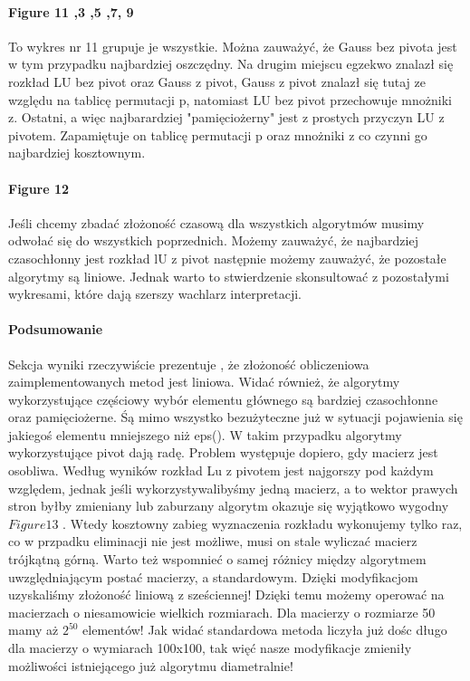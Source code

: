 \documentclass[11pt]{article}
\begin{document}
\begin{flushleft}
\begin{flushleft}
\paragraph{Figure 11 ,3 ,5 ,7, 9}
 To wykres nr 11 grupuje je wszystkie. Można zauważyć, że Gauss bez pivota jest w tym przypadku najbardziej oszczędny. Na drugim miejscu egzekwo znalazł się rozkład LU bez pivot oraz Gauss z pivot, Gauss z pivot znalazł się tutaj ze względu na tablicę permutacji p, natomiast LU bez pivot przechowuje mnożniki z. Ostatni, a więc najbarardziej "pamięciożerny" jest z prostych przyczyn LU z pivotem. Zapamiętuje on tablicę permutacji p oraz mnożniki z co czynni go najbardziej kosztownym.
\paragraph{Figure 12}
Jeśli chcemy zbadać złożoność czasową dla wszystkich algorytmów musimy odwołać się do wszystkich poprzednich. Możemy zauważyć, że najbardziej czasochłonny jest rozkład lU z pivot następnie możemy zauważyć, że pozostałe  algorytmy są liniowe. Jednak warto to stwierdzenie skonsultować z pozostałymi wykresami, które dają szerszy wachlarz interpretacji.
\paragraph{Podsumowanie} Sekcja wyniki rzeczywiście prezentuje , że złożoność obliczeniowa zaimplementowanych metod jest liniowa. Widać również, że algorytmy wykorzystujące częściowy wybór elementu głównego są bardziej czasochłonne oraz pamięciożerne. Śą mimo wszystko bezużyteczne już w sytuacji pojawienia się jakiegoś elementu mniejszego niż eps(). W takim przypadku algorytmy wykorzystujące pivot dają radę. Problem występuje dopiero, gdy macierz jest osobliwa. Według wyników rozkład Lu z pivotem jest najgorszy pod każdym względem, jednak jeśli wykorzystywalibyśmy jedną macierz, a to wektor prawych stron byłby zmieniany lub zaburzany algorytm okazuje się wyjątkowo wygodny$Figure 13$ . Wtedy kosztowny zabieg wyznaczenia rozkładu wykonujemy tylko raz, co w przpadku eliminacji nie jest możliwe, musi on stale wyliczać macierz trójkątną górną. Warto też wspomnieć o samej różnicy między algorytmem uwzględniającym postać macierzy, a standardowym. Dzięki modyfikacjom uzyskaliśmy złożoność liniową z sześciennej! Dzięki temu możemy operować na macierzach o niesamowicie wielkich rozmiarach. Dla macierzy o rozmiarze 50 mamy aż $2^{50}$ elementów! Jak widać standardowa metoda liczyła już dośc długo dla macierzy o wymiarach 100x100, tak więć nasze modyfikacje zmieniły możliwości istniejącego już algorytmu diametralnie!\\
\end{flushleft}
\end{flushleft}
\end{document}
